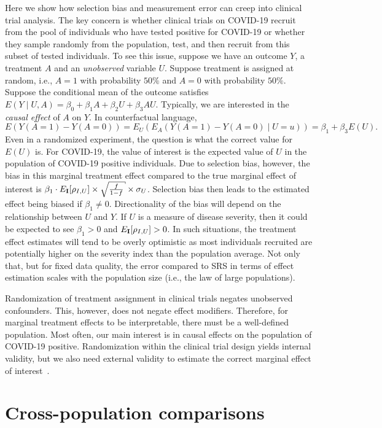 \documentclass[aoas]{amsart}
\def\I{\bf I}
\begin{document}
Here we show how selection bias and measurement error can creep into clinical trial analysis. The key concern is whether clinical trials on COVID-19 recruit from the pool of individuals who have tested positive for COVID-19 or whether they sample randomly from the population, test, and then recruit from this subset of tested individuals.  To see this issue, suppose we have an outcome $Y$, a treatment $A$ and an \emph{unobserved} variable $U$.  Suppose treatment is assigned at random, i.e., $A =1$ with probability $50\%$ and $A=0$ with probability $50\%$.  Suppose the conditional mean of the outcome satisfies  $E(Y \mid U, A ) = \beta_0 + \beta_1 A + \beta_2 U + \beta_3 A U$.  Typically, we are interested in the \emph{causal effect} of $A$ on $Y$.  In counterfactual language,
$$
E( Y(A=1) - Y(A=0) ) = E_U ( E_A ( Y(A=1) - Y(A=0) \mid U=u ))
= \beta_1 + \beta_3 E(U).
$$
Even in a randomized experiment, the question is what the correct value for $E(U)$ is. For COVID-19, the value of interest is the expected value of $U$ in the population of COVID-19 positive individuals.  Due to selection bias, however, the bias in this marginal treatment effect compared to the true marginal effect of interest is $\beta_1 \cdot E_{\I} [ \rho_{I,U} ] \times \sqrt{ \frac{f}{1-f} } \times \sigma_U$.  Selection bias then leads to the estimated effect being biased if $\beta_1 \neq 0$.  Directionality of the bias will depend on the relationship between $U$ and $Y$.  If $U$ is a measure of disease severity, then it could be expected to see $\beta_1 > 0$ and $E_{\I} [ \rho_{I, U} ] >0$.  In such situations, the treatment effect estimates will tend to be overly optimistic as most individuals recruited are potentially higher on the severity index than the population average.  Not only that, but for fixed data quality, the error compared to SRS in terms of effect estimation scales with the population size (i.e., the law of large populations).

Randomization of treatment assignment in clinical trials negates unobserved confounders.  This, however, does not negate effect modifiers.  Therefore, for marginal treatment effects to be interpretable, there must be a well-defined population.  Most often, our main interest is in causal effects on the population of COVID-19 positive.  Randomization within the clinical trial design yields internal validity, but we also need external validity to estimate the correct marginal effect of interest~\cite{Keiding2016}.

\section{Cross-population comparisons}
\end{document}
